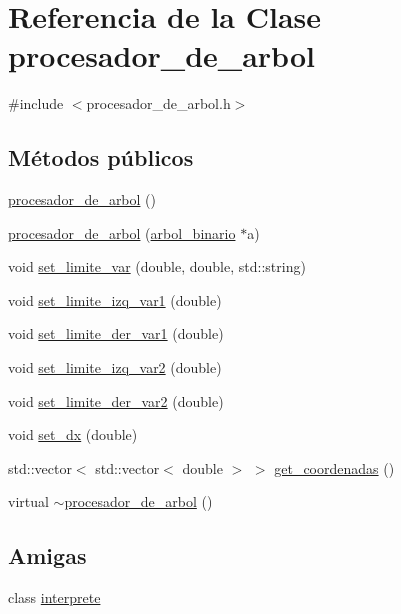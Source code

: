 \hypertarget{classprocesador__de__arbol}{}\section{Referencia de la Clase procesador\+\_\+de\+\_\+arbol}
\label{classprocesador__de__arbol}


{\ttfamily \#include $<$procesador\+\_\+de\+\_\+arbol.\+h$>$}

\subsection*{Métodos públicos}
\begin{DoxyCompactItemize}
\item 
\hyperlink{classprocesador__de__arbol_a53d1353f7f45c1c8f598b06ffe926013}{procesador\+\_\+de\+\_\+arbol} ()
\item 
\hyperlink{classprocesador__de__arbol_aa2855bf172b1905953151f30831ccc57}{procesador\+\_\+de\+\_\+arbol} (\hyperlink{classarbol__binario}{arbol\+\_\+binario} $\ast$a)
\item 
void \hyperlink{classprocesador__de__arbol_a10c6f07e756ec8f24ea6c03e5667f678}{set\+\_\+limite\+\_\+var} (double, double, std\+::string)
\item 
void \hyperlink{classprocesador__de__arbol_a9fc7381f5154945680282f5254ec3bb5}{set\+\_\+limite\+\_\+izq\+\_\+var1} (double)
\item 
void \hyperlink{classprocesador__de__arbol_a9d7373da915494df493a3d680202ddab}{set\+\_\+limite\+\_\+der\+\_\+var1} (double)
\item 
void \hyperlink{classprocesador__de__arbol_a2856554c0f176f573191f058e0d986e6}{set\+\_\+limite\+\_\+izq\+\_\+var2} (double)
\item 
void \hyperlink{classprocesador__de__arbol_a40dafe014152055b9feef034e2b219d9}{set\+\_\+limite\+\_\+der\+\_\+var2} (double)
\item 
void \hyperlink{classprocesador__de__arbol_a935fc64d0623a3a4730f2403a4e63513}{set\+\_\+dx} (double)
\item 
std\+::vector$<$ std\+::vector$<$ double $>$ $>$ \hyperlink{classprocesador__de__arbol_acba5d0493f3870d08809457021b76b39}{get\+\_\+coordenadas} ()
\item 
virtual \hyperlink{classprocesador__de__arbol_af3693ac1fe14c40a38bc2faef6c21ec2}{$\sim$procesador\+\_\+de\+\_\+arbol} ()
\end{DoxyCompactItemize}
\subsection*{Amigas}
\begin{DoxyCompactItemize}
\item 
class \hyperlink{classprocesador__de__arbol_a23e1c0df69f77fadf06bdb6be2b6355b}{interprete}
\end{DoxyCompactItemize}


